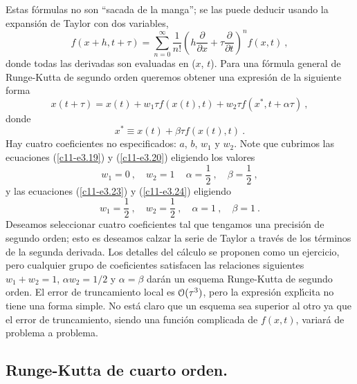 Estas f{\'o}rmulas no son ``sacada de la manga''; se las puede deducir usando
la expansi{\'o}n de Taylor con dos variables,
\begin{equation}
\label{c11-e3.25}
f(x+h, t+\tau)=\sum_{n=0}^\infty \frac 1{n!}\left ( h\frac
  {\partial}{\partial x}+\tau\frac{\partial}{\partial t}\right )^n f(x,t)\ ,
\end{equation}
donde todas las derivadas son evaluadas en ($x$, $t$). Para una
f{\'o}rmula general de Runge-Kutta de segundo orden queremos obtener una
expresi{\'o}n de la siguiente forma
\begin{equation}
\label{c11-e3.26}
x(t+\tau)=x(t)+w_1\tau f(x(t), t)+w_2\tau f(x^*, t+\alpha\tau)\ ,
\end{equation}
donde
\begin{equation}
\label{c11-e3.27}
x^*\equiv x(t)+\beta\tau f(x(t),t)\ .
\end{equation}
Hay cuatro coeficientes no especificados: $a$, $b$, $w_1$ y $w_2$.
Note que cubrimos las ecuaciones (\ref{c11-e3.19}) y (\ref{c11-e3.20})
eligiendo los valores 
\begin{equation}
w_1=0\ ,\quad  w_2=1\, \quad  \alpha=\frac 12\ , \quad \beta=\frac 12\ ,
\end{equation}
y las ecuaciones (\ref{c11-e3.23}) y (\ref{c11-e3.24}) eligiendo
\begin{equation}
w_1=\frac 12\ ,\quad  w_2=\frac 12\ ,\quad \alpha=1\ ,\quad  \beta=1\ .
\end{equation}
Deseamos seleccionar cuatro coeficientes tal que tengamos una
precisi{\'o}n de segundo orden; esto es deseamos calzar la serie de Taylor
a trav{\'e}s de los t{\'e}rminos de la segunda derivada.  Los detalles del
c{\'a}lculo se proponen como un ejercicio, pero cualquier grupo de
coeficientes satisfacen las relaciones siguientes $w_1+w_2=1$, $\alpha
w_2=1/2$ y $\alpha=\beta$ dar{\'a}n un esquema Runge-Kutta de segundo orden.  El
error de truncamiento local es $\EuScript{O}(\tau^3)$, pero la expresi{\'o}n
expl{\'\i}cita no tiene una forma simple. No est{\'a} claro que un esquema sea
superior al otro ya que el error de truncamiento, siendo una funci{\'o}n
complicada de $f(x,t)$, variar{\'a} de problema a problema.

\subsection{Runge-Kutta de cuarto orden.}

